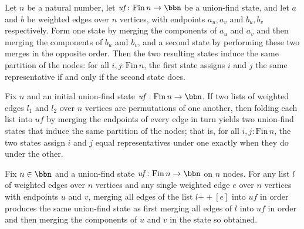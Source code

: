 \begin{lemma}
\label{Kruskal.merge_swap_partition}
\leanok
{}
Let $n$ be a natural number, let $\mathit{uf}\colon \mathrm{Fin}\,n \to \bbn$ be a
union-find state, and let $a$ and $b$ be weighted edges over $n$ vertices, with
endpoints $a_u, a_v$ and $b_u, b_v$ respectively. Form one state by merging the
components of $a_u$ and $a_v$ and then merging the components of $b_u$ and $b_v$, and a
second state by performing these two merges in the opposite order. Then the two
resulting states induce the same partition of the nodes: for all $i, j :
\mathrm{Fin}\,n$, the first state assigns $i$ and $j$ the same representative if and
only if the second state does.
\end{lemma}

\begin{lemma}
\label{Kruskal.mergeAll_perm}
\leanok
{}
Fix $n$ and an initial union-find state $\mathit{uf} : \mathrm{Fin}\,n \to \bbn$. If two
lists of weighted edges $l_1$ and $l_2$ over $n$ vertices are permutations of one
another, then folding each list into $\mathit{uf}$ by merging the endpoints of every
edge in turn yields two union-find states that induce the same partition of the nodes;
that is, for all $i, j : \mathrm{Fin}\,n$, the two states assign $i$ and $j$ equal
representatives under one exactly when they do under the other.
\end{lemma}

\begin{lemma}
\label{Kruskal.mergeAll_append_single}
\leanok
{}
Fix $n \in \bbn$ and a union-find state $\mathit{uf} \colon \mathrm{Fin}\,n \to \bbn$ on
$n$ nodes. For any list $l$ of weighted edges over $n$ vertices and any single weighted
edge $e$ over $n$ vertices with endpoints $u$ and $v$, merging all edges of the list $l
\mathbin{+\!\!+} [e]$ into $\mathit{uf}$ in order produces the same union-find state as
first merging all edges of $l$ into $\mathit{uf}$ in order and then merging the
components of $u$ and $v$ in the state so obtained.
\end{lemma}

